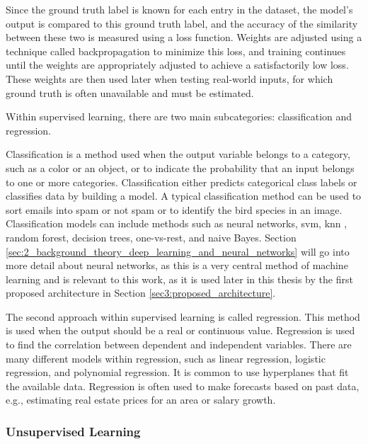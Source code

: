         Since the ground truth label is known for each entry in the dataset, the model's output is compared to this ground truth label, and the accuracy of the similarity between these two is measured using a loss function. Weights are adjusted using a technique called backpropagation to minimize this loss, and training continues until the weights are appropriately adjusted to achieve a satisfactorily low loss. These weights are then used later when testing real-world inputs, for which ground truth is often unavailable and must be estimated.
        
        Within supervised learning, there are two main subcategories: classification and regression. 
        
        Classification is a method used when the output variable belongs to a category, such as a color or an object, or to indicate the probability that an input belongs to one or more categories. Classification either predicts categorical class labels or classifies data by building a model. A typical classification method can be used to sort emails into spam or not spam or to identify the bird species in an image. Classification models can include methods such as neural networks, \gls{svm}, \gls{knn} \cite{fixDiscriminatoryAnalysisNonparametric1989, coverNearestNeighborPattern1967}, random forest, decision trees, one-vs-rest, and naive Bayes. Section \ref{sec:2_background_theory_deep_learning_and_neural_networks} will go into more detail about neural networks, as this is a very central method of machine learning and is relevant to this work, as it is used later in this thesis by the first proposed architecture in Section \ref{sec3:proposed_architecture}.
        
        The second approach within supervised learning is called regression. This method is used when the output should be a real or continuous value. Regression is used to find the correlation between dependent and independent variables. There are many different models within regression, such as linear regression, logistic regression, and polynomial regression. It is common to use hyperplanes that fit the available data. Regression is often used to make forecasts based on past data, e.g., estimating real estate prices for an area or salary growth.


        \subsubsection{Unsupervised Learning}

